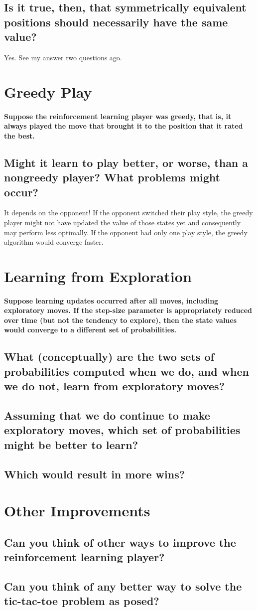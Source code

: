 \documentclass{article}
\begin{document}
\subsection{Is it true, then, that symmetrically equivalent positions should necessarily have the same value?}
Yes. See my answer two questions ago.

\section{Greedy Play}
\paragraph{Suppose the reinforcement learning player was greedy, that is, it always played the move that brought it to the position that it rated the best.}
\subsection{Might it learn to play better, or worse, than a nongreedy player? What problems might occur?}
It depends on the opponent! If the opponent switched their play style, the greedy player might not have updated the value of those states yet and consequently may perform less optimally.  If the opponent had only one play style, the greedy algorithm would converge faster.

\section{Learning from Exploration}
\paragraph{Suppose learning updates occurred after all moves, including exploratory moves. If the step-size parameter is appropriately reduced over time (but not the tendency to explore), then the state values would converge to a different set of probabilities.}
\subsection{What (conceptually) are the two sets of probabilities computed when we do, and when we do not, learn from exploratory moves?}
\subsection{Assuming that we do continue to make exploratory moves, which set of probabilities might be better to learn?}
\subsection{Which would result in more wins?}

\section{Other Improvements}
\subsection{Can you think of other ways to improve the reinforcement learning player?}
\subsection{Can you think of any better way to solve the tic-tac-toe problem as posed?}
    
\end{document}
